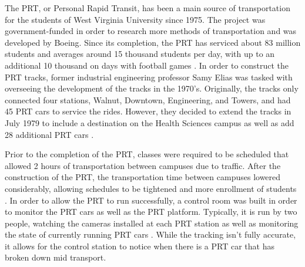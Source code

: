The PRT, or Personal Rapid Transit, has been a main source of transportation for the students of West Virginia University since 1975. The project was government-funded in order to research more methods of transportation and was developed by Boeing. Since its completion, the PRT has serviced about 83 million students and averages around 15 thousand students per day, with up to an additional 10 thousand on days with football games \cite{Booth_2007}. In order to construct the PRT tracks, former industrial engineering professor Samy Elias was tasked with overseeing the development of the tracks in the 1970’s. Originally, the tracks only connected four stations, Walnut, Downtown, Engineering, and Towers, and had 45 PRT cars to service the rides. However, they decided to extend the tracks in July 1979 to include a destination on the Health Sciences campus as well as add 28 additional PRT cars \cite{Booth_2007}. 

Prior to the completion of the PRT, classes were required to be scheduled that allowed 2 hours of transportation between campuses due to traffic. After the construction of the PRT, the transportation time between campuses lowered considerably, allowing schedules to be tightened and more enrollment of students \cite{Trenkner_2011}.  In order to allow the PRT to run successfully, a control room was built in order to monitor the PRT cars as well as the PRT platform. Typically, it is run by two people, watching the cameras installed at each PRT station as well as monitoring the state of currently running PRT cars \cite{Trenkner_2011}. While the tracking isn’t fully accurate, it allows for the control station to notice when there is a PRT car that has broken down mid transport.